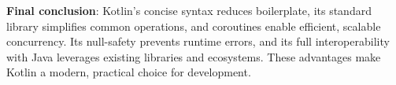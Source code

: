 \vspace{1em}

\noindent \textbf{Final conclusion}: Kotlin’s concise syntax reduces boilerplate, its standard library simplifies common operations, and coroutines enable efficient, scalable concurrency. Its null-safety prevents runtime errors, and its full interoperability with Java leverages existing libraries and ecosystems. These advantages make Kotlin a modern, practical choice for development.




